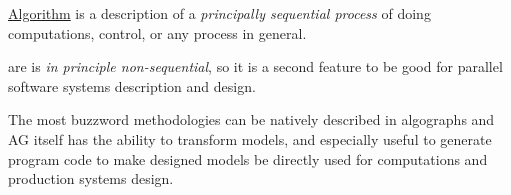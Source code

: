 \clearpage
{}

\noindent
\href{http://en.wikipedia.org/wiki/Algorithm}{Algorithm} is a description of a
\emph{principally sequential process} of doing computations, control, or any
process in general.

\medskip\noindent
{} are is \emph{in principle non-sequential}, so it is a second feature to be
good for parallel software systems description and design.

\medskip\noindent
The most buzzword methodologies can be natively described in algographs and AG
itself has the ability to transform models, and especially useful to generate
program code to make designed models be directly used for computations and
production systems design.


